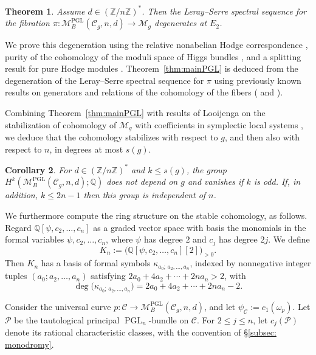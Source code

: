 \documentclass[11pt,reqno]{amsart}
\theoremstyle{plain} %
\newtheorem{theorem}{Theorem}[section]
\newtheorem{corollary}[theorem]{Corollary}
\theoremstyle{definition}
\newcommand{\QQ}{\mathbb{Q}}
\newcommand{\M}{\mathcal{M}}
\newcommand{\C}{\mathcal{C}}
\newcommand{\ZZ}{\mathbb{Z}}
\DeclareMathOperator{\PGL}{PGL}
\begin{document}
\begin{theorem} \label{thm:E2PGL}
    Assume $d \in (\ZZ/n\ZZ)^*$. Then the Leray--Serre spectral sequence for the fibration $\pi \colon \M_B^{\PGL}(\C_{g},n,d) \to \M_g$ degenerates at $E_2$.
\end{theorem}

\noindent We prove this degeneration using the relative nonabelian Hodge correspondence \cite{Simpson-reps2}, purity of the cohomology of the moduli space of Higgs bundles \cite[Corollary~1.3.2]{Semiprojective}, and a splitting result for pure Hodge modules \cite[(4.5.4)]{Saito}. Theorem~\ref{thm:mainPGL} is deduced from the degeneration of the Leray--Serre spectral sequence for $\pi$ using previously known results on generators and relations of the cohomology of the fibers (\cite[Theorem~7]{Markman} and \cite[Lemma 4.1.12]{Hausel-RV}). %


Combining Theorem~\ref{thm:mainPGL} with results of Looijenga on the stabilization of cohomology of $\M_g$ with coefficients in symplectic local systems \cite{looijenga-symplectic-coeffs}, we deduce that the cohomology stabilizes with respect to $g$, and then also with respect to $n$, in degrees at most $s(g)$.

\begin{corollary} \label{cor:stab-PGL}
For $d \in (\ZZ/n\ZZ)^*$ and $k \leq s(g)$, the group $H^k(\M_B^{\PGL}(\C_g, n,d); \QQ)$ does not depend on $g$ and vanishes if $k$ is odd.  If, in addition, $k \le 2n-1$ then this group is independent of $n$. 
\end{corollary}

We furthermore compute the ring structure on the stable cohomology, as follows.   Regard $\QQ[\psi,c_2,\ldots,c_n]$ as a graded vector space with basis the monomials in the formal variables $\psi,c_2,\ldots,c_n$, where $\psi$ has degree $2$ and $c_j$ has degree $2j$. We define
\begin{equation}\label{eq:Kn}
K_n:=\big(\QQ[\psi,c_2,\ldots,c_n][2]\big)_{>0}.
\end{equation}
Then $K_n$ has a basis of formal symbols $\kappa_{a_0;\,a_2,\ldots,a_n}$,
indexed by nonnegative integer tuples $(a_0; a_2,\ldots,a_n)$ satisfying $2a_0+4a_2+\cdots+2na_n>2$, with
\[
\deg\big(\kappa_{a_0;\,a_2,\ldots,a_n}\big)=2a_0+4a_2+\cdots+2na_n-2.
\]


Consider the universal curve $p\colon\C\longrightarrow\M_B^{\PGL}(\C_g,n,d)$, and let $\psi_\C := c_1(\omega_p)$. Let $\mathcal P$ be the tautological principal $\PGL_n$-bundle on $\C$. For $2\leq j\leq n$, let $c_j(\mathcal P)$ denote its rational characteristic classes, with the convention of \S\ref{subsec: monodromy}.
\end{document}
